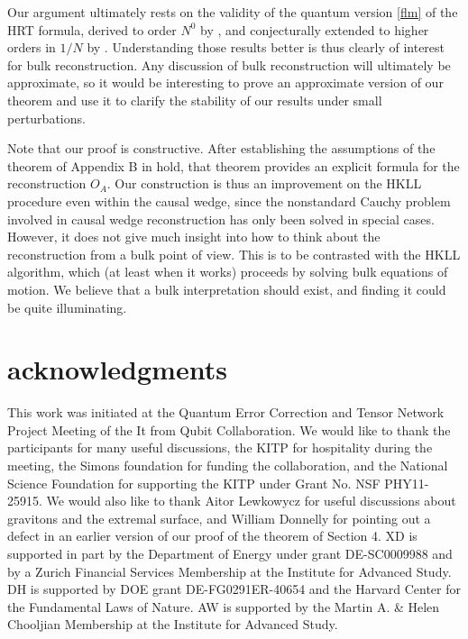 \documentclass[aps,prl,twocolumn,nofootinbib,longbibliography,superscriptaddress]{revtex4-1}
\begin{document}
Our argument ultimately rests on the validity of the quantum version \eqref{flm} of the HRT formula, derived to order $N^0$ by \cite{Faulkner:2013ana}, and conjecturally extended to higher orders in $1/N$ by \cite{Engelhardt:2014gca}.  Understanding those results better is thus clearly of interest for bulk reconstruction.  Any discussion of bulk reconstruction will ultimately be approximate, so it would be interesting to prove an approximate version of our theorem and use it to clarify the stability of our results under small perturbations.

Note that our proof is constructive.  After establishing the assumptions of the theorem of Appendix B in \cite{Almheiri:2014lwa} hold, that theorem provides an explicit formula for the reconstruction $O_A$.  Our construction is thus an improvement on the HKLL procedure even within the causal wedge, since the nonstandard Cauchy problem involved in causal wedge reconstruction has only been solved in special cases.  However, it does not give much insight into how to think about the reconstruction from a bulk point of view.  This is to be contrasted with the HKLL algorithm, which (at least when it works) proceeds by solving bulk equations of motion.  We believe that a bulk interpretation should exist, and finding it could be quite illuminating.

\section*{acknowledgments}
{\small This work was initiated at the Quantum Error Correction and Tensor Network Project Meeting of the It from Qubit Collaboration.  We would like to thank the participants for many useful discussions, the KITP for hospitality during the meeting, the Simons foundation for funding the collaboration, and the National Science Foundation for supporting the KITP under Grant No. NSF PHY11-25915.  We would also like to thank Aitor Lewkowycz for useful discussions about gravitons and the extremal surface, and William Donnelly for pointing out a defect in an earlier version of our proof of the theorem of Section 4.  XD is supported in part by the Department of Energy under grant DE-SC0009988 and by a Zurich Financial Services Membership at the Institute for Advanced Study.  DH is supported by DOE grant  DE-FG0291ER-40654 and the Harvard Center for the Fundamental Laws of Nature. AW is supported by the Martin A. \& Helen Chooljian Membership at the Institute for Advanced Study.}

\appendix\label{proof}
\end{document}
